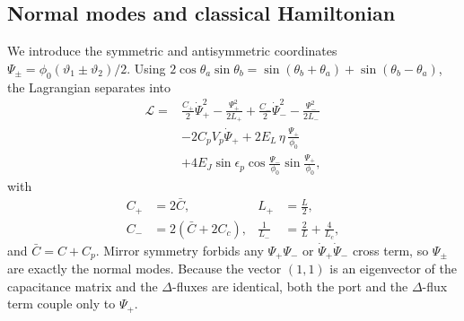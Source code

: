 \documentclass[aps,prx,reprint,floatfix,amsmath,amssymb,longbibliography]{revtex4-2}
\begin{document}
\subsection{Normal modes and classical Hamiltonian}

We introduce the symmetric and antisymmetric coordinates
$\Psi_\pm=\phi_0(\vartheta_1\pm\vartheta_2)/2$. Using
$2\cos\theta_a\sin\theta_b=\sin(\theta_b+\theta_a)+\sin(\theta_b-\theta_a)$,
the Lagrangian separates into
\begin{equation}
\begin{aligned}
  \mathcal{L}={}&\frac{C_+}{2}\dot{\Psi}_+^2-\frac{\Psi_+^2}{2L_+}
  +\frac{C_-}{2}\dot{\Psi}_-^2-\frac{\Psi_-^2}{2L_-}\\
  &-2C_pV_p\dot{\Psi}_+
  +2E_L\,\eta\,\frac{\Psi_+}{\phi_0}\\
  &+4E_J\sin\epsilon_p\cos\frac{\Psi_-}{\phi_0}\sin\frac{\Psi_+}{\phi_0},
\end{aligned}
\label{eq:app_Lnormal}
\end{equation}
with
\begin{equation}
\begin{aligned}
  C_+&=2\bar{C}, & L_+&=\frac{L}{2},\\
  C_-&=2(\bar{C}+2C_c), & \frac{1}{L_-}&=\frac{2}{L}+\frac{4}{L_c},
\end{aligned}
\end{equation}
and $\bar{C}=C+C_p$. Mirror symmetry forbids any $\Psi_+\Psi_-$ or
$\dot{\Psi}_+\dot{\Psi}_-$ cross term, so $\Psi_\pm$ are exactly the
normal modes. Because the vector $(1,1)$ is an eigenvector of the
capacitance matrix and the $\Delta$-fluxes are identical, both the port
and the $\Delta$-flux term couple only to $\Psi_+$.
\end{document}
